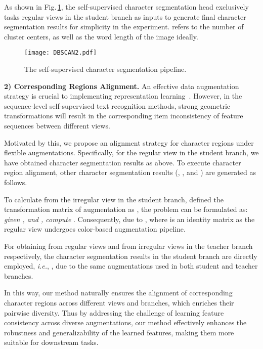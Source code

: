 \documentclass[10pt,twocolumn,letterpaper]{article}
\begin{document}
As shown in Fig.\,\ref{Figs.DBSCAN}, the self-supervised character segmentation head exclusively tasks regular views in the student branch as inputs to generate final character segmentation results  for simplicity in the experiment.  refers to the number of cluster centers, as well as the word length of the image ideally.

\begin{figure}[t]
  \centering
  \graphicspath{{./graph/}}
  \texttt{[image: DBSCAN2.pdf]}
  \caption{The self-supervised character segmentation pipeline. 
  }
  \label{Figs.DBSCAN}
  \vspace{-1.0em}
\end{figure}
\noindent \textbf{2) Corresponding Regions Alignment.}
An effective data augmentation strategy is crucial to implementing representation learning~\cite{SimCLR,asano2019critical,henaff2020data}. However, in the sequence-level self-supervised text recognition methods, strong geometric transformations will result in the corresponding item inconsistency of feature sequences between different views. 

Motivated by this, we propose an alignment strategy for character regions under flexible augmentations. Specifically,  for the regular view in the student branch, we have obtained character segmentation results  as above. To execute character region alignment, other character segmentation results (, , and ) are generated as follows.

To calculate  from the irregular view in the student branch, defined the transformation matrix of augmentation as , the problem can be formulated as: \emph{given , and , compute }. Consequently,  due to , where  is an identity matrix as the regular view undergoes color-based augmentation pipeline. 

For obtaining  from regular views and  from irregular views in the teacher branch respectively, the character segmentation results in the student branch are directly employed, \emph{i.e.}, , due to the same augmentations used in both student and teacher branches.

In this way, our method naturally ensures the alignment of corresponding character regions across different views and branches, which enriches their pairwise diversity. Thus by addressing the challenge of learning feature consistency across diverse augmentations, our method effectively enhances the robustness and generalizability of the learned features, making them more suitable for downstream tasks. 
\end{document}
